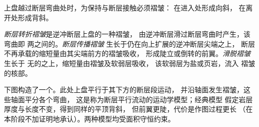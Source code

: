 上盘越过断层弯曲处时，为保持与断层接触必须褶皱：
在进入处形成向斜，
在离开处形成背斜。

\begin{definition}\label{def:b3:orogenic-wedges:thrust-folds}
\emph{断层转折褶皱}是逆冲断层上盘的一种褶皱，
由逆冲断层滑过断层弯曲时产生，该弯曲即
两之间的。\emph{断层传播褶皱}
生长于仍在向上扩展的逆冲断层尖端之上，
断层不再承载的缩短量由其尖端前方的褶皱吸收，
形成陡立或倒转的前翼。\emph{滑脱褶皱}生长于
无的之上，缩短量由褶皱及软弱层吸收，
该软弱层为盐或页岩，流入
褶皱的核部。
\end{definition}

下图构造了一个。此处上盘平行于其下方的断层段运动，
并沿轴面发生褶皱，这些轴面平分各个弯曲，
这是称为断层平行流动的运动学模型；经典模型
假定岩层厚度与长度不变，得到同样的平顶背斜，
但前翼更陡，代价是作图过程更长
（在本阶段不加证明地承认）。两种模型均受面积守恒约束。

